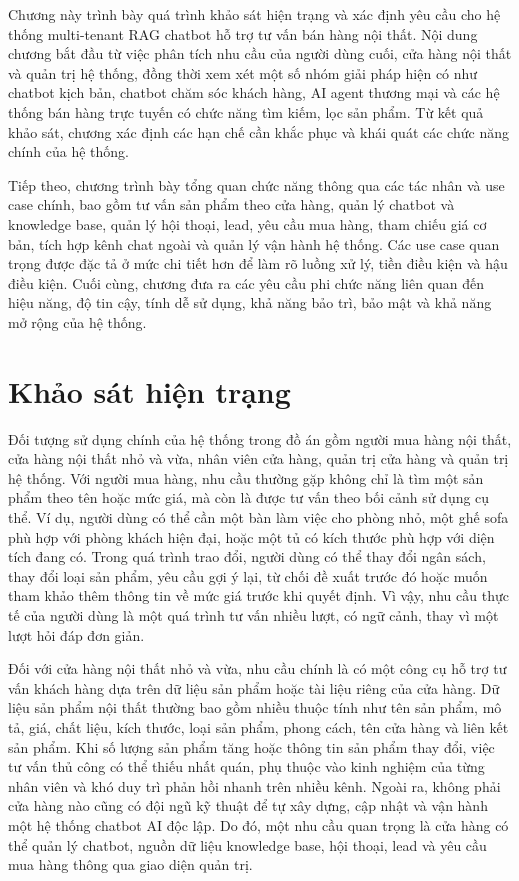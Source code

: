 \documentclass[../DoAn.tex]{subfiles}
\begin{document}
Chương này trình bày quá trình khảo sát hiện trạng và xác định yêu cầu cho hệ thống multi-tenant RAG chatbot hỗ trợ tư vấn bán hàng nội thất. Nội dung chương bắt đầu từ việc phân tích nhu cầu của người dùng cuối, cửa hàng nội thất và quản trị hệ thống, đồng thời xem xét một số nhóm giải pháp hiện có như chatbot kịch bản, chatbot chăm sóc khách hàng, AI agent thương mại và các hệ thống bán hàng trực tuyến có chức năng tìm kiếm, lọc sản phẩm. Từ kết quả khảo sát, chương xác định các hạn chế cần khắc phục và khái quát các chức năng chính của hệ thống.

Tiếp theo, chương trình bày tổng quan chức năng thông qua các tác nhân và use case chính, bao gồm tư vấn sản phẩm theo cửa hàng, quản lý chatbot và knowledge base, quản lý hội thoại, lead, yêu cầu mua hàng, tham chiếu giá cơ bản, tích hợp kênh chat ngoài và quản lý vận hành hệ thống. Các use case quan trọng được đặc tả ở mức chi tiết hơn để làm rõ luồng xử lý, tiền điều kiện và hậu điều kiện. Cuối cùng, chương đưa ra các yêu cầu phi chức năng liên quan đến hiệu năng, độ tin cậy, tính dễ sử dụng, khả năng bảo trì, bảo mật và khả năng mở rộng của hệ thống.

\section{Khảo sát hiện trạng}
\label{section:2.1}

Đối tượng sử dụng chính của hệ thống trong đồ án gồm người mua hàng nội thất, cửa hàng nội thất nhỏ và vừa, nhân viên cửa hàng, quản trị cửa hàng và quản trị hệ thống. Với người mua hàng, nhu cầu thường gặp không chỉ là tìm một sản phẩm theo tên hoặc mức giá, mà còn là được tư vấn theo bối cảnh sử dụng cụ thể. Ví dụ, người dùng có thể cần một bàn làm việc cho phòng nhỏ, một ghế sofa phù hợp với phòng khách hiện đại, hoặc một tủ có kích thước phù hợp với diện tích đang có. Trong quá trình trao đổi, người dùng có thể thay đổi ngân sách, thay đổi loại sản phẩm, yêu cầu gợi ý lại, từ chối đề xuất trước đó hoặc muốn tham khảo thêm thông tin về mức giá trước khi quyết định. Vì vậy, nhu cầu thực tế của người dùng là một quá trình tư vấn nhiều lượt, có ngữ cảnh, thay vì một lượt hỏi đáp đơn giản.

Đối với cửa hàng nội thất nhỏ và vừa, nhu cầu chính là có một công cụ hỗ trợ tư vấn khách hàng dựa trên dữ liệu sản phẩm hoặc tài liệu riêng của cửa hàng. Dữ liệu sản phẩm nội thất thường bao gồm nhiều thuộc tính như tên sản phẩm, mô tả, giá, chất liệu, kích thước, loại sản phẩm, phong cách, tên cửa hàng và liên kết sản phẩm. Khi số lượng sản phẩm tăng hoặc thông tin sản phẩm thay đổi, việc tư vấn thủ công có thể thiếu nhất quán, phụ thuộc vào kinh nghiệm của từng nhân viên và khó duy trì phản hồi nhanh trên nhiều kênh. Ngoài ra, không phải cửa hàng nào cũng có đội ngũ kỹ thuật để tự xây dựng, cập nhật và vận hành một hệ thống chatbot AI độc lập. Do đó, một nhu cầu quan trọng là cửa hàng có thể quản lý chatbot, nguồn dữ liệu knowledge base, hội thoại, lead và yêu cầu mua hàng thông qua giao diện quản trị.
\end{document}
